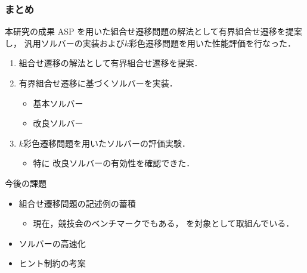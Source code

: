 \documentclass[dvipdfmx,11pt]{beamer}
\begin{document}
\begin{frame}\frametitle{まとめ}

  \begin{alertblock}{本研究の成果}\centering
    ASP を用いた組合せ遷移問題の解法として有界組合せ遷移を提案し，
    汎用ソルバーの実装および$k$彩色遷移問題を用いた性能評価を行なった．
  \end{alertblock}

  \begin{enumerate}
    \item 組合せ遷移の解法として有界組合せ遷移を提案．
    \item 有界組合せ遷移に基づくソルバーを実装．
    \begin{itemize}
      \item 基本ソルバー
      \item 改良ソルバー
    \end{itemize}
    \item $k$彩色遷移問題を用いたソルバーの評価実験．
    \begin{itemize}
      \item 特に
        改良ソルバーの有効性を確認できた．
    \end{itemize}
  \end{enumerate}
  
  \begin{exampleblock}{今後の課題}
    \begin{itemize}
      \item 組合せ遷移問題の記述例の蓄積
        \begin{itemize}
          \item 現在，競技会のベンチマークでもある，
            を対象として取組んでいる．
        \end{itemize}
      \item ソルバーの高速化
      \item ヒント制約の考案
    \end{itemize}
  \end{exampleblock}
\end{frame}
\end{document}
